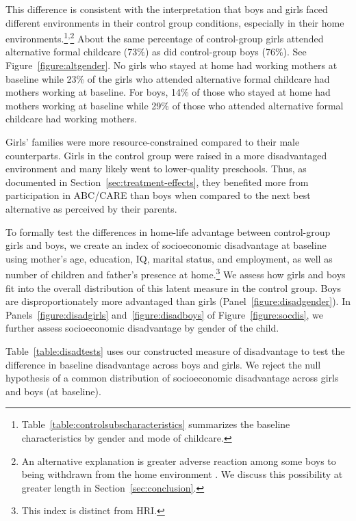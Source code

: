 This difference is consistent with the interpretation that boys and girls faced different environments in their control group conditions, especially in their home environments.\footnote{Table~\ref{table:controlsubscharacteristics} summarizes the baseline characteristics by gender and mode of childcare.}\textsuperscript{,}\footnote{An alternative explanation is greater adverse reaction among some boys to being withdrawn from the home environment \citep{Garcia_etal_2019_ECE_IMHJ}. We discuss this possibility at greater length in Section~\ref{sec:conclusion}.} About the same percentage of control-group girls attended alternative formal childcare (73\%) as did control-group boys (76\%). See Figure~\ref{figure:altgender}. No girls who stayed at home had working mothers at baseline while 23\% of the girls who attended alternative formal childcare had mothers working at baseline. For boys, 14\% of those who stayed at home had mothers working at baseline while 29\% of those who attended alternative formal childcare had working mothers.

Girls' families were more resource-constrained compared to their male counterparts. Girls in the control group were raised in a more disadvantaged environment and many likely went to lower-quality preschools. Thus, as documented in Section~\ref{sec:treatment-effects}, they benefited more from participation in ABC/CARE than boys when compared to the next best alternative as perceived by their parents.

To formally test the differences in home-life advantage between control-group girls and boys, we create an index of socioeconomic disadvantage at baseline using mother's age, education, IQ, marital status, and employment, as well as number of children and father's presence at home.\footnote{This index is distinct from HRI.} We assess how girls and boys fit into the overall distribution of this latent measure in the control group. Boys are disproportionately more advantaged than girls (Panel~\ref{figure:disadgender}). In Panels~\ref{figure:disadgirls} and~\ref{figure:disadboys} of Figure~\ref{figure:socdis}, we further assess socioeconomic disadvantage by gender of the child.

Table~\ref{table:disadtests} uses our constructed measure of disadvantage to test the difference in baseline disadvantage across boys and girls. We reject the null hypothesis of a common distribution of socioeconomic disadvantage across girls and boys (at baseline).

